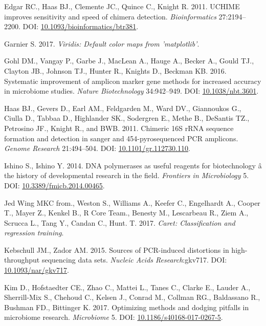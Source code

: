 \documentclass[11pt,]{article}
\begin{document}
\hypertarget{ref-uchime_Edgar_2011}{}
Edgar RC., Haas BJ., Clemente JC., Quince C., Knight R. 2011. UCHIME
improves sensitivity and speed of chimera detection.
\emph{Bioinformatics} 27:2194--2200. DOI:
\href{https://doi.org/10.1093/bioinformatics/btr381}{10.1093/bioinformatics/btr381}.

\hypertarget{ref-viridis_citation_2017}{}
Garnier S. 2017. \emph{Viridis: Default color maps from 'matplotlib'}.

\hypertarget{ref-taq_Gohl_2016}{}
Gohl DM., Vangay P., Garbe J., MacLean A., Hauge A., Becker A., Gould
TJ., Clayton JB., Johnson TJ., Hunter R., Knights D., Beckman KB. 2016.
Systematic improvement of amplicon marker gene methods for increased
accuracy in microbiome studies. \emph{Nature Biotechnology} 34:942--949.
DOI: \href{https://doi.org/10.1038/nbt.3601}{10.1038/nbt.3601}.

\hypertarget{ref-Haas2011}{}
Haas BJ., Gevers D., Earl AM., Feldgarden M., Ward DV., Giannoukos G.,
Ciulla D., Tabbaa D., Highlander SK., Sodergren E., Methe B., DeSantis
TZ., Petrosino JF., Knight R., and BWB. 2011. Chimeric 16S rRNA sequence
formation and detection in sanger and 454-pyrosequenced PCR amplicons.
\emph{Genome Research} 21:494--504. DOI:
\href{https://doi.org/10.1101/gr.112730.110}{10.1101/gr.112730.110}.

\hypertarget{ref-polymerase_Ishino_2014}{}
Ishino S., Ishino Y. 2014. DNA polymerases as useful reagents for
biotechnology â the history of developmental research in the field.
\emph{Frontiers in Microbiology} 5. DOI:
\href{https://doi.org/10.3389/fmicb.2014.00465}{10.3389/fmicb.2014.00465}.

\hypertarget{ref-caret_citation}{}
Jed Wing MKC from., Weston S., Williams A., Keefer C., Engelhardt A.,
Cooper T., Mayer Z., Kenkel B., R Core Team., Benesty M., Lescarbeau R.,
Ziem A., Scrucca L., Tang Y., Candan C., Hunt. T. 2017. \emph{Caret:
Classification and regression training}.

\hypertarget{ref-Kebschull2015}{}
Kebschull JM., Zador AM. 2015. Sources of PCR-induced distortions in
high-throughput sequencing data sets. \emph{Nucleic Acids
Research}:gkv717. DOI:
\href{https://doi.org/10.1093/nar/gkv717}{10.1093/nar/gkv717}.

\hypertarget{ref-review_Kim_2017}{}
Kim D., Hofstaedter CE., Zhao C., Mattei L., Tanes C., Clarke E., Lauder
A., Sherrill-Mix S., Chehoud C., Kelsen J., Conrad M., Collman RG.,
Baldassano R., Bushman FD., Bittinger K. 2017. Optimizing methods and
dodging pitfalls in microbiome research. \emph{Microbiome} 5. DOI:
\href{https://doi.org/10.1186/s40168-017-0267-5}{10.1186/s40168-017-0267-5}.
\end{document}
